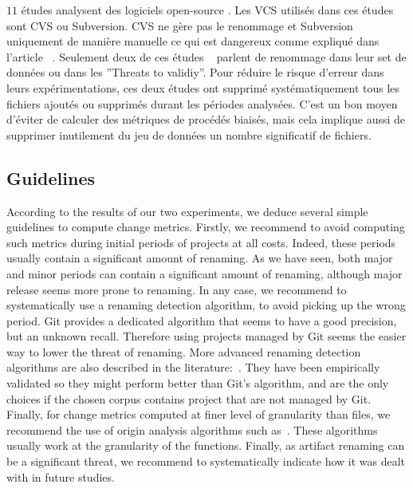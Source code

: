 $11$ études analysent des logiciels open-source \cite{dambros_relationship_2009,bacchelli_are_2010,caglayan_merits_2009,dambros_evaluating_2012,dambros_evaluating_2012,dambros_extensive_2010,illes-seifert_exploring_2010,li_finding_2005,matsumoto_analysis_2010,moser_analysis_2008,moser_comparative_2008,schroter_if_2006}. Les VCS utilisés dans ces études sont CVS ou Subversion. CVS ne gère pas le renommage et Subversion uniquement de manière manuelle ce qui est dangereux comme expliqué dans l'article ~\cite{lavoie_inferring_2012,steidl_incremental_2014}. Seulement deux de ces études ~\cite{moser_analysis_2008,moser_comparative_2008} parlent de renommage dans leur set de données ou dans les ''Threats to validiy''. Pour réduire le risque d'erreur dans leurs expérimentations, ces deux études ont supprimé systématiquement tous les fichiers ajoutés ou supprimés durant les périodes analysées. C'est un bon moyen d'éviter de calculer des métriques de procédés biaisés, mais cela implique aussi de supprimer inutilement du jeu de données un nombre significatif de fichiers.\\

\subsection{Guidelines}
\label{sec:guidelines}

According to the results of our two experiments, we deduce several simple guidelines to compute change metrics. Firstly, we recommend to avoid computing such metrics during initial periods of projects at all costs. Indeed, these periods usually contain a significant amount of renaming. As we have seen, both major and minor periods can contain a significant amount of renaming, although major release seems more prone to renaming. In any case, we recommend to systematically use a renaming detection algorithm, to avoid picking up the wrong period. Git provides a dedicated algorithm that seems to have a good precision, but an unknown recall. Therefore using projects managed by Git seems the easier way to lower the threat of renaming. More advanced renaming detection algorithms are also described in the literature:~\cite{antoniol_automatic_2004,lavoie_inferring_2012,steidl_incremental_2014}. They have been empirically validated so they might perform better than Git's algorithm, and are the only choices if the chosen corpus contains project that are not managed by Git. Finally, for change metrics computed at finer level of granularity than files, we recommend the use of origin analysis algorithms such as~\cite{wu_aura:_2010}. These algorithms usually work at the granularity of the functions. Finally, as artifact renaming can be a significant threat, we recommend to systematically indicate how it was dealt with in future studies.
